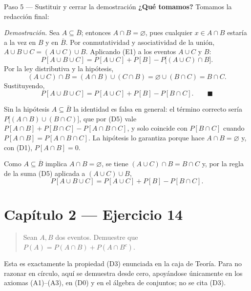 \documentclass[11pt]{article}
\begin{document}
\begin{sol}
\begin{paso}{Paso 5 --- Sustituir y cerrar la demostración}
\textbf{¿Qué tomamos?} Tomamos la redacción final:

\medskip
\emph{Demostración.} Sea $A\subseteq\overline{B}$; entonces $A\cap B=\varnothing$, pues
cualquier $x\in A\cap B$ estaría a la vez en $B$ y en $\overline{B}$. Por conmutatividad y
asociatividad de la unión, $A\cup B\cup C=(A\cup C)\cup B$. Aplicando (E1) a los eventos
$A\cup C$ y $B$:
\[
P[A\cup B\cup C]=P[A\cup C]+P[B]-P\big[(A\cup C)\cap B\big].
\]
Por la ley distributiva y la hipótesis,
\[
(A\cup C)\cap B=(A\cap B)\cup(C\cap B)=\varnothing\cup(B\cap C)=B\cap C .
\]
Sustituyendo,
\[
P[A\cup B\cup C]=P[A\cup C]+P[B]-P[B\cap C]. \qquad\blacksquare
\]
\end{paso}

\begin{nota}
Sin la hipótesis $A\subseteq\overline{B}$ la identidad es falsa en general: el término correcto
sería $P\big[(A\cap B)\cup(B\cap C)\big]$, que por (D5) vale
$P[A\cap B]+P[B\cap C]-P[A\cap B\cap C]$, y solo coincide con $P[B\cap C]$ cuando
$P[A\cap B]=P[A\cap B\cap C]$. La hipótesis lo garantiza porque hace $A\cap B=\varnothing$ y,
con (D1), $P[A\cap B]=0$.
\end{nota}

\end{sol}

\begin{resp}
Como $A\subseteq\overline{B}$ implica $A\cap B=\varnothing$, se tiene $(A\cup C)\cap B=B\cap C$
y, por la regla de la suma (D5) aplicada a $(A\cup C)\cup B$,
\[
\boxed{\;P[A\cup B\cup C]=P[A\cup C]+P[B]-P[B\cap C].\;}
\]
\end{resp}

\section*{Capítulo 2 --- Ejercicio 14}

\begin{quote}
Sean $A,B$ dos eventos. Demuestre que $P(A)=P(A\cap B)+P(A\cap B^{c})$.
\end{quote}

\begin{nota}
Esta es exactamente la propiedad (D3) enunciada en la caja de Teoría. Para no razonar en
círculo, aquí se demuestra desde cero, apoyándose únicamente en los axiomas (A1)--(A3), en (D0)
y en el álgebra de conjuntos; no se cita (D3).
\end{nota}
\end{document}

